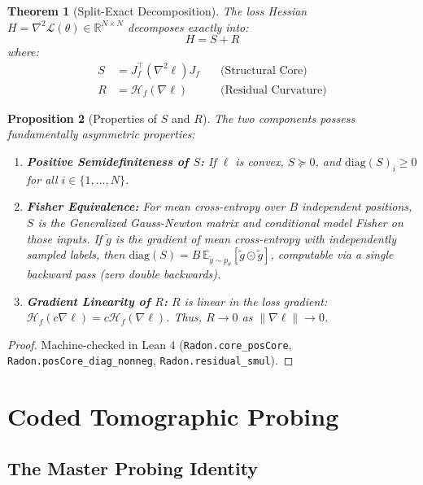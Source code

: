\documentclass[11pt,a4paper]{article}
\newtheorem{theorem}{Theorem}
\newtheorem{proposition}[theorem]{Proposition}
\theoremstyle{definition}
\theoremstyle{remark}
\begin{document}
\begin{theorem}[Split-Exact Decomposition]
The loss Hessian $H = \nabla^2 \mathcal{L}(\theta) \in \mathbb{R}^{N \times N}$ decomposes exactly into:
\begin{equation}
H = S + R
\end{equation}
where:
\begin{align}
S &= J_f^\top (\nabla^2 \ell) J_f \quad &\text{(Structural Core)} \\
R &= \mathcal{H}_f(\nabla \ell) \quad &\text{(Residual Curvature)}
\end{align}
\end{theorem}

\begin{proposition}[Properties of $S$ and $R$]
\label{prop:split_props}
The two components possess fundamentally asymmetric properties:
\begin{enumerate}
    \item \textbf{Positive Semidefiniteness of $S$:} If $\ell$ is convex, $S \succeq 0$, and $\mathrm{diag}(S)_i \ge 0$ for all $i \in \{1, \dots, N\}$.
    \item \textbf{Fisher Equivalence:} For mean cross-entropy over $B$ independent positions, $S$ is the Generalized Gauss-Newton matrix and conditional model Fisher on those inputs. If $\tilde{g}$ is the gradient of mean cross-entropy with independently sampled labels, then $\mathrm{diag}(S) = B\,\mathbb{E}_{\tilde{y} \sim p_\theta}[\tilde{g} \odot \tilde{g}]$, computable via a single backward pass (zero double backwards).
    \item \textbf{Gradient Linearity of $R$:} $R$ is linear in the loss gradient: $\mathcal{H}_f(c \nabla \ell) = c \mathcal{H}_f(\nabla \ell)$. Thus, $R \to 0$ as $\|\nabla \ell\| \to 0$.
\end{enumerate}
\end{proposition}
\begin{proof}
Machine-checked in Lean 4 (\texttt{Radon.core\_posCore}, \texttt{Radon.posCore\_diag\_nonneg}, \texttt{Radon.residual\_smul}).
\end{proof}

\section{Coded Tomographic Probing}

\subsection{The Master Probing Identity}
\end{document}
